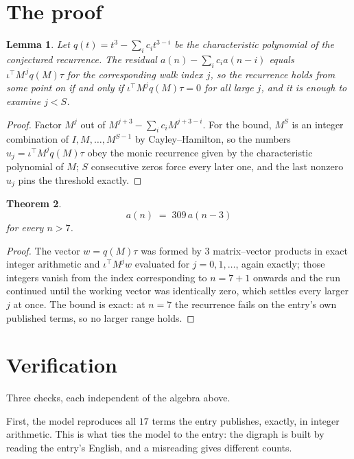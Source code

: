 \documentclass[11pt,a4paper]{article}
\theoremstyle{plain}
\newtheorem{theorem}{Theorem}
\newtheorem{lemma}[theorem]{Lemma}
\theoremstyle{definition}
\begin{document}
\section{The proof}

\begin{lemma}\label{lem:crit}
Let $q(t)=t^{3}-\sum_i c_it^{3-i}$ be the characteristic polynomial of the
conjectured recurrence. The residual $a(n)-\sum_ic_ia(n-i)$ equals
$\iota^{\!\top}M^{\,j}q(M)\tau$ for the corresponding walk index $j$, so the recurrence
holds from some point on if and only if $\iota^{\!\top}M^{j}q(M)\tau=0$ for all large $j$,
and it is enough to examine $j<S$.
\end{lemma}

\begin{proof}
Factor $M^{j}$ out of $M^{j+3}-\sum_ic_iM^{j+3-i}$. For the bound, $M^{S}$
is an integer combination of $I,M,\dots,M^{S-1}$ by Cayley--Hamilton, so the numbers
$u_j=\iota^{\!\top}M^{j}q(M)\tau$ obey the monic recurrence given by the characteristic
polynomial of $M$; $S$ consecutive zeros force every later one, and the last nonzero $u_j$
pins the threshold exactly.
\end{proof}

\begin{theorem}
\[
a(n)\;=\;309\,a(n-3)
\]
for every $n>7$.
\end{theorem}

\begin{proof}
The vector $w=q(M)\tau$ was formed by $3$ matrix--vector products in exact integer
arithmetic and $\iota^{\!\top}M^{j}w$ evaluated for $j=0,1,\dots$, again exactly; those
integers vanish from the index corresponding to $n=7+1$ onwards and the run continued
until the working vector was identically zero, which settles every larger $j$ at once. The bound is exact: at $n=7$ the recurrence fails on the entry's own published terms, so no larger range holds.
\end{proof}

\section{Verification}

Three checks, each independent of the algebra above.

First, the model reproduces all $17$ terms the entry publishes, exactly, in integer
arithmetic. This is what ties the model to the entry: the digraph is built by reading the
entry's English, and a misreading gives different counts.
\end{document}
